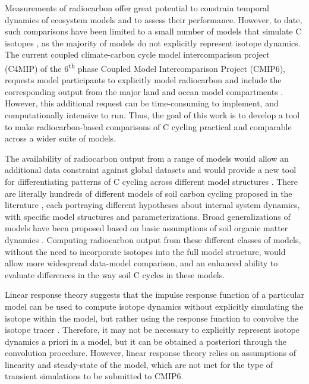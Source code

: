 \documentclass[11pt,a4paper]{article}
\begin{document}
Measurements of radiocarbon offer great potential to constrain temporal dynamics of ecosystem models and to assess their performance. However, to date, such comparisons have been limited to a small number of models that simulate C isotopes \citep[e.g.][]{Koven2013, Tifafi2018}, as the majority of models do not explicitly represent isotope dynamics. The current coupled climate-carbon cycle model intercomparison project (C4MIP) of the 6\textsuperscript{th} phase Coupled Model Intercomparison Project (CMIP6), requests model participants to explicitly model radiocarbon and include the corresponding output from the major land and ocean model compartments \citep{Jones2016, Graven2017}. However, this additional request can be time-consuming to implement, and computationally intensive to run. Thus, the goal of this work is to develop a tool to make radiocarbon-based comparisons of C cycling practical and comparable across a wider suite of models.

The availability of radiocarbon output from a range of models would allow an additional data constraint against global datasets \citep{He2016, Mathieu2015} and would provide a new tool for differentiating patterns of C cycling across different model structures \citep{Sierra2014}. 
There are literally hundreds of different models of soil carbon cycling proposed in the literature \citep{Manzoni2009SBB}, each portraying different hypotheses about internal system dynamics, with specific model structures and parameterizations. Broad generalizations of models have been proposed based on basic assumptions of soil organic matter dynamics \citep{Sierra2015}.
Computing radiocarbon output from these different classes of models, without the need to incorporate isotopes into the full model structure, would allow more widespread data-model comparison, and an enhanced ability to evaluate differences in the way soil C cycles in these models.

Linear response theory suggests that the impulse response function of a particular model can be used to compute isotope dynamics without explicitly simulating the isotope within the model, but rather using the response function to convolve the isotope tracer \citep{Thompson1999}. Therefore, it may not be necessary to explicitly represent isotope dynamics a priori in a model, but it can be obtained a posteriori through the convolution procedure. However, linear response theory relies on assumptions of linearity and steady-state of the model, which are not met for the type of transient simulations to be submitted to CMIP6. 
\end{document}
